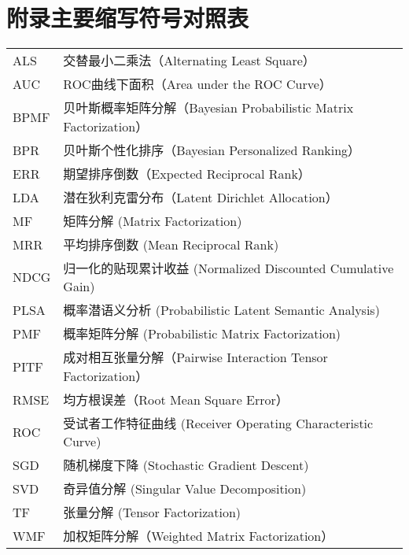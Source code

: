 \newpage
\chapter*{附录\quad 主要缩写符号对照表}
\vskip 5mm

\begin{tabular}{p{}p{}}
	ALS  & 交替最小二乘法（Alternating Least Square）  \\
	AUC  & ROC曲线下面积（Area under the ROC Curve）  \\
	BPMF  & 贝叶斯概率矩阵分解（Bayesian Probabilistic Matrix Factorization）  \\
	BPR  & 贝叶斯个性化排序（Bayesian Personalized Ranking）  \\
	ERR & 期望排序倒数（Expected Reciprocal Rank）  \\
	LDA  & 潜在狄利克雷分布（Latent Dirichlet Allocation）  \\
	MF  & 矩阵分解 (Matrix Factorization)  \\
	MRR  & 平均排序倒数 (Mean Reciprocal Rank) \\
	NDCG  & 归一化的贴现累计收益 (Normalized Discounted Cumulative Gain)  \\
	PLSA  & 概率潜语义分析 (Probabilistic Latent Semantic Analysis) \\
	PMF & 概率矩阵分解 (Probabilistic Matrix Factorization)  \\
	PITF & 成对相互张量分解（Pairwise Interaction Tensor Factorization）  \\
	RMSE & 均方根误差（Root Mean Square Error）\\
	ROC  & 受试者工作特征曲线 (Receiver Operating Characteristic Curve)  \\
	SGD & 随机梯度下降 (Stochastic Gradient Descent)  \\
	SVD & 奇异值分解 (Singular Value Decomposition)  \\
	TF  & 张量分解 (Tensor Factorization) \\
	WMF  & 加权矩阵分解（Weighted Matrix Factorization）  \\
\end{tabular}


\clearpage
\phantom{s}
\clearpage
 
